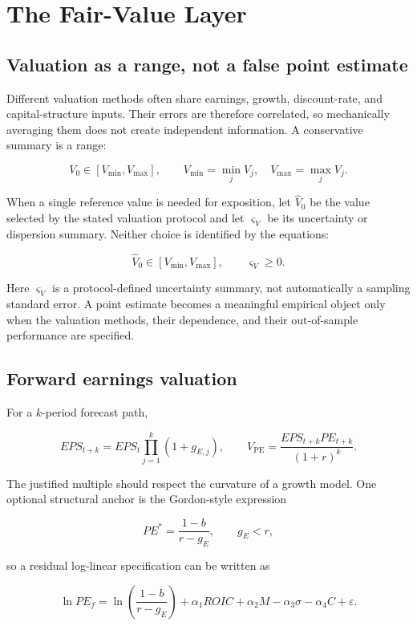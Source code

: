 \section{The Fair-Value Layer}
\label{sec:value}

\subsection{Valuation as a range, not a false point estimate}

Different valuation methods often share earnings, growth, discount-rate, and
capital-structure inputs. Their errors are therefore correlated, so mechanically
averaging them does not create independent information. A conservative summary
is a range:

\[
\boxed{
V_0\in[V_{\min},V_{\max}],
\qquad
V_{\min}=\min_j V_j,
\quad
V_{\max}=\max_j V_j.
}
\]

When a single reference value is needed for exposition, let $\hat V_0$ be the
value selected by the stated valuation protocol and let $\varsigma_V$ be its
uncertainty or dispersion summary. Neither choice is identified by the equations:

\[
\hat V_0\in[V_{\min},V_{\max}],
\qquad
\varsigma_V\ge 0.
\]

Here $\varsigma_V$ is a protocol-defined uncertainty summary, not automatically
a sampling standard error. A point estimate becomes a meaningful empirical
object only when the valuation methods, their dependence, and their out-of-sample
performance are specified.

\subsection{Forward earnings valuation}

For a $k$-period forecast path,

\[
EPS_{t+k}=EPS_t\prod_{j=1}^{k}(1+g_{E,j}),
\qquad
V_{\mathrm{PE}}=\frac{EPS_{t+k}PE_{t+k}}{(1+r)^k}.
\]

The justified multiple should respect the curvature of a growth model. One
optional structural anchor is the Gordon-style expression

\[
PE^*=\frac{1-b}{r-g_E},
\qquad g_E<r,
\]

so a residual log-linear specification can be written as

\[
\ln PE_f
=\ln\left(\frac{1-b}{r-g_E}\right)
 +\alpha_1 ROIC+\alpha_2 M-\alpha_3\sigma-\alpha_4 C+\varepsilon.
\]

